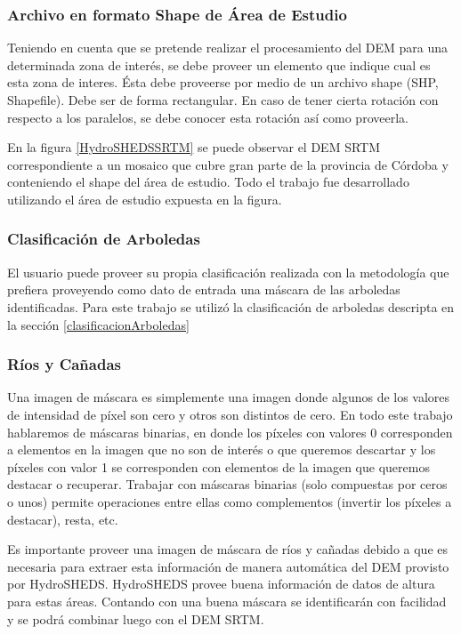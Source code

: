 \documentclass[10pt,a4paper, twoside]{report}
\begin{document}
\subsubsection{Archivo en formato Shape de Área de Estudio}

Teniendo en cuenta que se pretende realizar el procesamiento del DEM para una determinada zona de interés, se debe proveer un elemento que indique cual es esta zona de interes. Ésta debe proveerse por medio de un archivo shape (SHP, Shapefile). Debe ser de forma rectangular. En caso de tener cierta rotación con respecto a los paralelos, se debe conocer esta rotación así como proveerla. 

En la figura \ref{HydroSHEDSSRTM} se puede observar el DEM SRTM correspondiente a un mosaico que cubre gran parte de la provincia de Córdoba y conteniendo el shape del área de estudio. Todo el trabajo fue desarrollado utilizando el área de estudio expuesta en la figura.




\subsubsection{Clasificación de Arboledas}

El usuario puede proveer su propia clasificación realizada con la metodología que prefiera proveyendo como dato de entrada una máscara de las arboledas identificadas. Para este trabajo se utilizó la clasificación de arboledas descripta en la sección \ref{clasificacionArboledas}


\subsubsection{Ríos y Cañadas}
\label{vectorRiosArea}

Una imagen de máscara es simplemente una imagen donde algunos de los valores de intensidad de píxel son cero y otros son distintos de cero. En todo este trabajo hablaremos de máscaras binarias, en donde los píxeles con valores 0 corresponden a elementos en la imagen que no son de interés o que queremos descartar y los píxeles con valor 1 se corresponden con elementos de la imagen que queremos destacar o recuperar. Trabajar con máscaras binarias (solo compuestas por ceros o unos) permite operaciones entre ellas como complementos (invertir los píxeles a destacar), resta, etc.

Es importante proveer una imagen de máscara de ríos y cañadas debido a que es necesaria para extraer esta información de manera automática del DEM provisto por HydroSHEDS. HydroSHEDS provee buena información de datos de altura para estas áreas. Contando con una buena máscara se identificarán con facilidad y se podrá combinar luego con el DEM SRTM.
\end{document}
